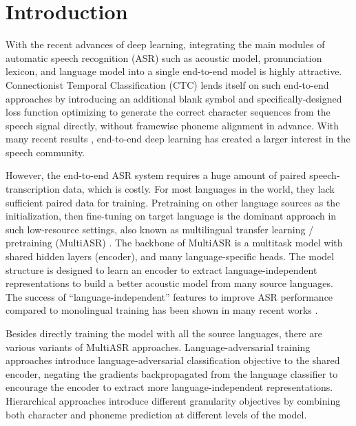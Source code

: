 \section{Introduction}
\label{sec:intro}

With the recent advances of deep learning, integrating the main modules of automatic speech recognition (ASR) such as acoustic model, pronunciation lexicon, and language model into a single end-to-end model is highly attractive. Connectionist Temporal Classification (CTC) \cite{graves2006connectionist} lends itself on such end-to-end approaches by introducing an additional blank symbol and specifically-designed loss function optimizing to generate the correct character sequences from the speech signal directly, without framewise phoneme alignment in advance. With many recent results \cite{hannun2014deep, amodei2016deep, collobert2016wav2letter}, end-to-end deep learning has created a larger interest in the speech community.

However, the end-to-end ASR system requires a huge amount of paired speech-transcription data, which is costly. 
For most languages in the world, they lack sufficient paired data for training. 
Pretraining on other language sources as the initialization, then fine-tuning on target language is the dominant approach in such low-resource settings, also known as multilingual transfer learning / pretraining (MultiASR) \cite{vu2014multilingual, tong2017investigation}. 
The backbone of MultiASR is a multitask model with shared hidden layers (encoder), and many language-specific heads. 
The model structure is designed to learn an encoder to extract language-independent representations to build a better acoustic model from many source languages. 
The success of ``language-independent'' features to improve ASR performance compared to monolingual training has been shown in many recent works \cite{cho2018multilingual, dalmia2018sequence}.



Besides directly training the model with all the source languages, there are various variants of MultiASR approaches. 
Language-adversarial training approaches \cite{Yi2018AdversarialMT, adams2019massively} introduce language-adversarial classification objective to the shared encoder, negating the gradients backpropagated from the language classifier to encourage the encoder to extract more language-independent representations. 
Hierarchical approaches \cite{Sanabria2018HierarchicalMT} introduce different granularity objectives by combining both character and phoneme prediction at different levels of the model.

